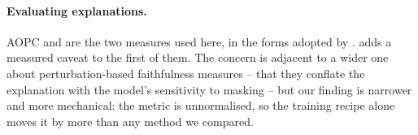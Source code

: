 \paragraph{Evaluating explanations.}
AOPC \citep{samek2017aopc} and \ndcg{} \citep{jarvelin2002ndcg} are the two measures used here, in
the forms adopted by \citet{early2024millet}.  adds a measured caveat to the first
of them. The concern is adjacent to a wider one about perturbation-based faithfulness measures --
that they conflate the explanation with the model's sensitivity to masking -- but our finding is
narrower and more mechanical: the metric is unnormalised, so the training recipe alone moves it by
more than any method we compared.
